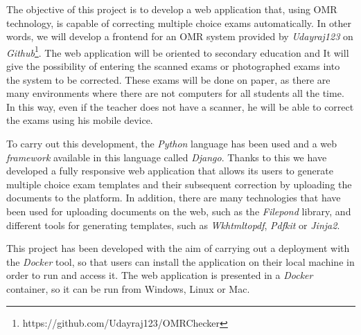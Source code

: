 \documentclass[a4paper, 12pt]{book}
\begin{document}
The objective of this project is to develop a web application that,
using OMR technology, is capable of correcting multiple choice
exams automatically. In other words, we will develop a frontend
for an OMR system provided by \textit{Udayraj123} on
\textit{Github}\footnote{https://github.com/Udayraj123/OMRChecker}.
The web application will be oriented to secondary education and
It will give the possibility of
entering the scanned exams or photographed exams into the
system to be corrected. These exams will be done on paper, as
there are many environments where there are not computers
for all students all the time. In this way, even if the teacher does
not have a scanner, he will be able to correct the exams using his
mobile device.

To carry out this development, the \textit{Python} language has been used
and a web \textit{framework} available in this language called \textit{Django}.
Thanks to this we have developed a fully responsive web application
that allows its users to generate multiple choice exam templates
and their subsequent correction by uploading the documents to
the platform. In addition, there are many technologies that have been used for
uploading documents on the web, such as the \textit{Filepond} library,
and different tools for generating templates, such as \textit{Wkhtmltopdf},
\textit{Pdfkit} or \textit{Jinja2}.

This project has been developed with the aim of carrying out
a deployment with the \textit{Docker} tool, so that users can install
the application on their local machine in order to run and
access it. The web application is
presented in a \textit{Docker} container, so it can be run from Windows, Linux or Mac.




\tableofcontents 
\cleardoublepage
\listoffigures %
\cleardoublepage
\listoftables %
\end{document}
